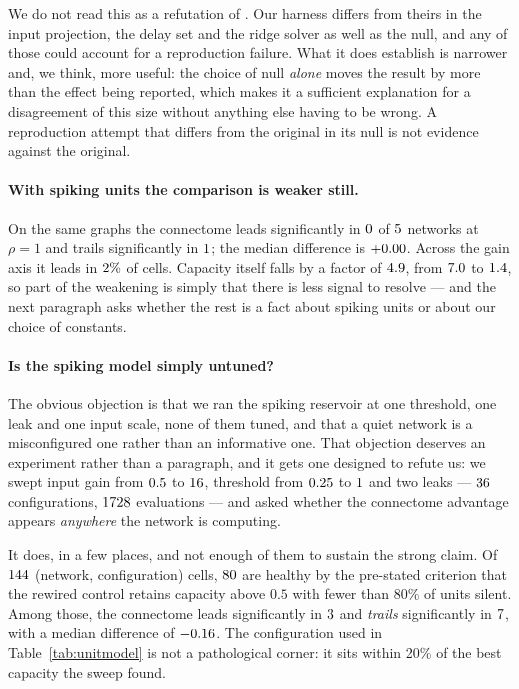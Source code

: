 We do not read this as a refutation of \cite{suarez2024connectome}. Our harness differs
from theirs in the input projection, the delay set and the ridge solver as well as the
null, and any of those could account for a reproduction failure. What it does establish
is narrower and, we think, more useful: the choice of null \emph{alone} moves the result
by more than the effect being reported, which makes it a sufficient explanation for a
disagreement of this size without anything else having to be wrong. A reproduction
attempt that differs from the original in its null is not evidence against the original.

\paragraph{With spiking units the comparison is weaker still.}
On the same graphs the connectome leads significantly in $0$ of
$5$ networks at $\rho = 1$ and trails significantly in
$1$; the median difference is $+0.00$. Across the gain axis it
leads in $2\%$ of cells. Capacity itself falls by a factor of
$4.9$, from $7.0$ to $1.4$, so part of the weakening is
simply that there is less signal to resolve --- and the next paragraph asks whether the
rest is a fact about spiking units or about our choice of constants.

\paragraph{Is the spiking model simply untuned?}
The obvious objection is that we ran the spiking reservoir at one threshold, one leak and
one input scale, none of them tuned, and that a quiet network is a misconfigured one
rather than an informative one. That objection deserves an experiment rather than a
paragraph, and it gets one designed to refute us: we swept input gain from $0.5$
to $16$, threshold from $0.25$ to $1$ and two leaks ---
$36$ configurations, $1728$ evaluations --- and asked whether the
connectome advantage appears \emph{anywhere} the network is computing.

It does, in a few places, and not enough of them to sustain the strong claim. Of
$144$ (network, configuration) cells, $80$ are healthy by the
pre-stated criterion that the rewired control retains capacity above $0.5$ with fewer
than 80\% of units silent. Among those, the connectome leads significantly in
$3$ and \emph{trails} significantly in $7$, with a median difference
of $-0.16$. The configuration used in Table~\ref{tab:unitmodel} is not a
pathological corner: it sits within 20\% of the best capacity the sweep found.

